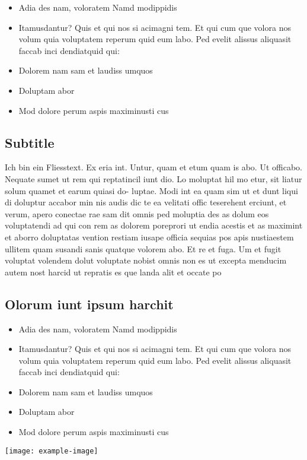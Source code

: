 \documentclass[
	trilingual,
	type=factsheet,
	headings=big,
]{bfhpub}
\begin{document}
\begin{itemize}
	\item Adia des nam, voloratem Namd modippidis
	\item Itamusdantur? Quis et qui nos si acimagni tem. Et qui cum que
	      volora nos volum quia voluptatem reperum quid eum labo. Ped
	      evelit alissus aliquasit faccab inci dendiatquid qui:
	\item Dolorem nam sam et laudiss umquos
	\item Doluptam abor
	\item Mod dolore perum aspis maximinusti cus
\end{itemize}

\bfhRule

\disableHeadlineLogo


\subsection{Subtitle}
Ich bin ein Fliesstext. Ex eria int. Untur, quam et etum quam is
abo. Ut officabo. Nequate sumet ut rem qui reptatincil iunt dio. Lo
moluptat hil mo etur, sit liatur solum quamet et earum quiasi do-
luptae. Modi int ea quam sim ut et dunt liqui di doluptur accabor
min nis audis dic te ea velitati offic teserehent erciunt, et verum,
apero conectae rae sam dit omnis ped moluptia des as dolum eos
voluptatendi ad qui con rem as dolorem poreprori ut endia acestis
et as maximint et aborro doluptatas vention restiam iusape officia
sequias pos apis nustiaestem ullitem quam susandi sanis quatque
volorem abo. Et re et fuga. Um et fugit voluptat volendem dolut
voluptate nobist omnis non es ut excepta menducim autem nost
harcid ut repratis es que landa alit et occate po

\subsection{Olorum iunt ipsum harchit}

\begin{itemize}
	\item Adia des nam, voloratem Namd modippidis
	\item Itamusdantur? Quis et qui nos si acimagni tem. Et qui cum que
	      volora nos volum quia voluptatem reperum quid eum labo. Ped
	      evelit alissus aliquasit faccab inci dendiatquid qui:
	\item Dolorem nam sam et laudiss umquos
	\item Doluptam abor
	\item Mod dolore perum aspis maximinusti cus
\end{itemize}

\noindent\texttt{[image: example-image]}

\bfhRule
\end{document}
